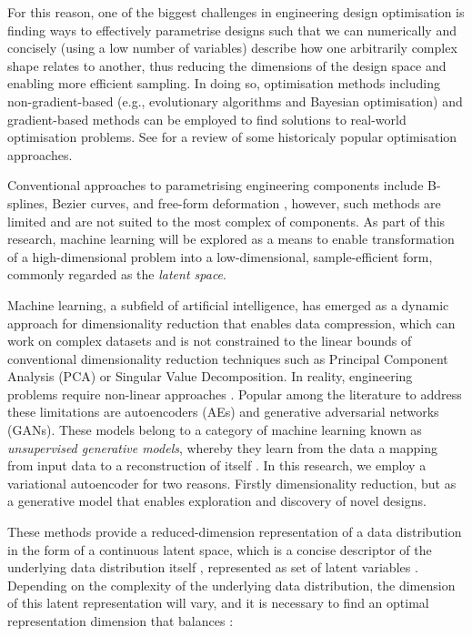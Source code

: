 \documentclass{article}
\begin{document}
For this reason, one of the biggest challenges in engineering design optimisation is finding ways to effectively parametrise designs such that we can numerically and concisely (using a low number of variables) describe how one arbitrarily complex shape relates to another, thus reducing the dimensions of the design space and enabling more efficient sampling. In doing so, optimisation methods including non-gradient-based \citep{Hare2013} (e.g., evolutionary algorithms and Bayesian optimisation) and gradient-based methods can be employed to find solutions to real-world optimisation problems. See \citep{Roy2008} for a review of some historicaly popular optimisation approaches.

 Conventional approaches to parametrising engineering components include B-splines, Bezier curves, and free-form deformation \citep{Jabn2024}, however, such methods are limited and are not suited to the most complex of components. As part of this research, machine learning will be explored as a means to enable transformation of a high-dimensional problem into a low-dimensional, sample-efficient form, commonly regarded as the \textit{latent space}. 

Machine learning, a subfield of artificial intelligence, has emerged as a dynamic approach for dimensionality reduction that enables data compression, which can work on complex datasets and is not constrained to the linear bounds of conventional dimensionality reduction techniques such as Principal Component Analysis (PCA) \citep{Lew2021} or Singular Value Decomposition. In reality, engineering problems require non-linear approaches \citep{Jabn2024}. Popular among the literature to address these limitations are autoencoders (AEs) and generative adversarial networks (GANs). These models belong to a category of machine learning known as \textit{unsupervised generative models}, whereby they learn from the data a mapping from input data to a reconstruction of itself \citep{Lew2021}.  In this research, we employ a variational autoencoder for two reasons. Firstly dimensionality reduction, but as a generative model that enables exploration and discovery of novel designs.

These methods provide a reduced-dimension representation of a data distribution in the form of a continuous latent space, which is a concise descriptor of the underlying data distribution itself \citep{Zheng2023}, represented as set of latent variables \citep{Jabn2024}. Depending on the complexity of the underlying data distribution, the dimension of this latent representation will vary, and it is necessary to find an optimal representation dimension that balances \citep{Lew2021}: 
\end{document}
